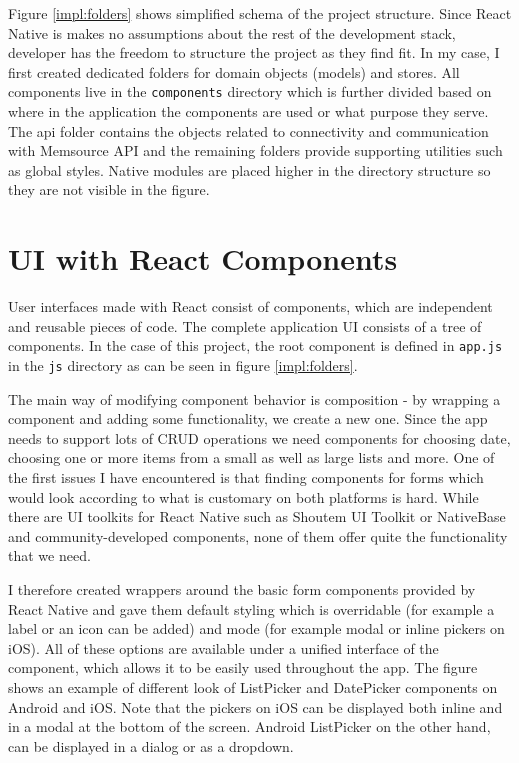 Figure \ref{impl:folders} shows simplified schema of the project structure. Since React Native is makes no assumptions about the rest of the development stack, developer has the freedom to structure the project as they find fit. In my case, I first created dedicated folders for domain objects (models) and stores. All components live in the \texttt{components} directory which is further divided based on where in the application the components are used or what purpose they serve. The api folder contains the objects related to connectivity and communication with Memsource API and the remaining folders provide supporting utilities such as global styles. Native modules are placed higher in the directory structure so they are not visible in the figure.


\section{UI with React Components}

User interfaces made with React consist of components, which are independent and reusable pieces of code. The complete application UI consists of a tree of components. In the case of this project, the root component is defined in \texttt{app.js} in the \texttt{js} directory as can be seen in figure \ref{impl:folders}.

The main way of modifying component behavior is composition - by wrapping a component and adding some functionality, we create a new one. Since the app needs to support lots of CRUD operations we need components for choosing date, choosing one or more items from a small as well as large lists and more. One of the first issues I have encountered is that finding components for forms which would look according to what is customary on both platforms is hard. While there are UI toolkits for React Native such as Shoutem UI Toolkit or NativeBase and community-developed components, none of them offer quite the functionality that we need.

I therefore created wrappers around the basic form components provided by React Native and gave them default styling which is overridable (for example a label or an icon can be added) and mode (for example modal or inline pickers on iOS). All of these options are available under a unified interface of the component, which allows it to be easily used throughout the app. The figure shows an example of different look of ListPicker and DatePicker components on Android and iOS. Note that the pickers on iOS can be displayed both inline and in a modal at the bottom of the screen. Android ListPicker on the other hand, can be displayed in a dialog or as a dropdown.

